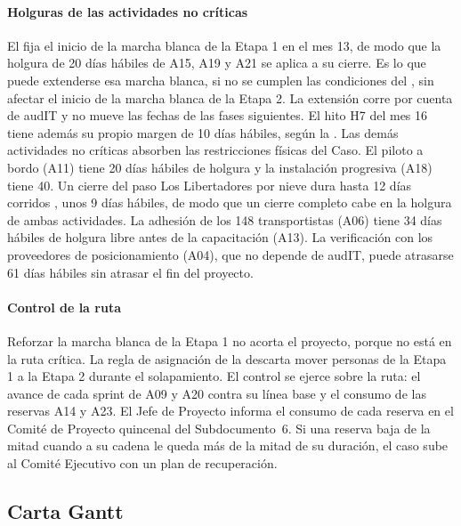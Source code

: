 \paragraph{Holguras de las actividades no críticas}
El  fija el inicio de la marcha blanca de la Etapa 1 en el mes 13, de modo que la holgura
de 20 días hábiles de A15, A19 y A21 se aplica a su cierre. Es lo que puede extenderse esa marcha
blanca, si no se cumplen las condiciones del , sin afectar el inicio de la marcha blanca
de la Etapa 2. La extensión corre por cuenta de audIT y no mueve las fechas de las fases siguientes. El
hito H7 del mes 16 tiene además su propio margen de 10 días hábiles, según la . Las
demás actividades no críticas absorben las restricciones físicas del Caso. El piloto a bordo (A11)
tiene 20 días hábiles de holgura y la instalación progresiva (A18) tiene 40. Un cierre del paso Los
Libertadores por nieve dura hasta 12 días corridos , unos 9 días hábiles, de
modo que un cierre completo cabe en la holgura de ambas actividades. La adhesión de los 148
transportistas (A06) tiene 34 días hábiles de holgura libre antes de la capacitación (A13). La
verificación con los proveedores de posicionamiento (A04), que no depende de audIT, puede atrasarse 61
días hábiles sin atrasar el fin del proyecto.

\paragraph{Control de la ruta}
Reforzar la marcha blanca de la Etapa 1 no acorta el proyecto, porque no está en la ruta crítica. La
regla de asignación de la  descarta mover personas de la Etapa 1 a la
Etapa 2 durante el solapamiento. El control se ejerce sobre la ruta: el avance de cada sprint de A09 y
A20 contra su línea base y el consumo de las reservas A14 y A23. El Jefe de Proyecto informa el consumo
de cada reserva en el Comité de Proyecto quincenal del Subdocumento~6. Si una reserva baja de la mitad
cuando a su cadena le queda más de la mitad de su duración, el caso sube al Comité Ejecutivo con un
plan de recuperación.

\subsection{Carta Gantt}\label{sec:7-gantt}


